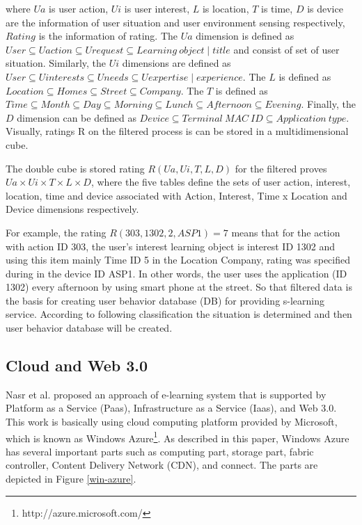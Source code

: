 \documentclass[journal]{vgtc}
\begin{document}
  where $Ua$ is user action, $Ui$ is user interest, $L$ is location, $T$ is time, $D$ is device are the information of user situation  and user environment sensing respectively, $Rating$ is the  information of rating. The $Ua$ dimension is defined as $User \subseteq Uaction \subseteq Urequest \subseteq Learning\ object \mid title$ and consist of set of user situation. Similarly, the $Ui$ dimensions are defined as $User \subseteq U interests \subseteq U needs \subseteq U expertise \mid experience$. The $L$ is defined as $Location \subseteq Homes \subseteq Street \subseteq Company$. The $T$ is defined as $Time \subseteq Month \subseteq Day \subseteq Morning \subseteq Lunch \subseteq Afternoon \subseteq Evening$. Finally, the $D$ dimension can be defined as $Device \subseteq Terminal\ MAC\ ID \subseteq Application\ type$. Visually, ratings R on the filtered process is can be stored in a multidimensional cube.


  The double cube is stored rating $R(Ua, Ui, T, L, D)$ for the filtered proves $Ua \times Ui \times T \times L \times D$, where the five tables define the sets of user action, interest, location, time and device associated with Action, Interest, Time x Location and Device dimensions respectively.

  For example, the rating $R(303,1302,2,ASP1)=7$ means that for the action with action ID 303, the user's interest learning object is interest ID 1302 and using this item mainly Time ID 5 in the Location Company, rating was specified during in the device ID ASP1. In other words, the user uses the application (ID 1302) every afternoon by using smart phone at the street. So that filtered data is the basis for creating user behavior database (DB) for providing s-learning service. According to following classification the situation is determined and then user behavior database will be created.

  
  \subsection{Cloud and Web 3.0}
  Nasr et al. \cite{nasr2012proposed} proposed an approach of e-learning system that is supported by Platform as a Service (Paas), Infrastructure as a Service (Iaas), and Web 3.0. This work is basically using cloud computing platform provided by Microsoft, which is known as Windows Azure\footnote{http://azure.microsoft.com/}. As described in this paper, Windows Azure has several important parts such as computing part, storage part, fabric controller, Content Delivery Network (CDN), and connect. The parts are depicted in Figure \ref{win-azure}.
\end{document}
